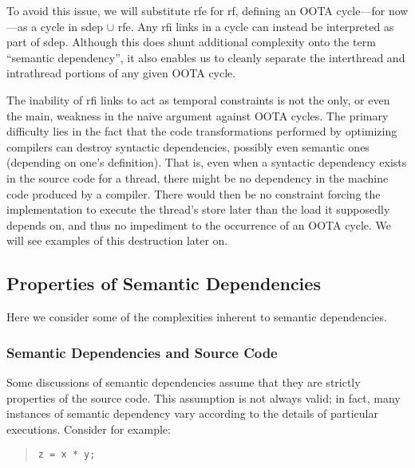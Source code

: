 To avoid this issue, we will substitute rfe
for rf, defining an OOTA cycle---for now---as a cycle in sdep $\cup$ rfe.
Any rfi links in a cycle can instead be interpreted as part of sdep.
Although this does shunt additional complexity onto the term
``semantic dependency'', it also enables us to cleanly separate
the interthread and intrathread portions of any given OOTA cycle.


The inability of rfi links to act as temporal constraints is not the
only, or even the main, weakness in the naive argument against
OOTA cycles.
The primary difficulty lies in the fact that the code transformations
performed by optimizing compilers can destroy syntactic dependencies,
possibly even semantic ones (depending on one's definition).
That is, even when a syntactic dependency exists in the
source code for a thread, there might be no dependency in the machine
code produced by a compiler.
There would then be no constraint forcing the implementation to execute
the thread's store later than the load it supposedly depends on,
and thus no impediment to the occurrence of an OOTA cycle.
We will see examples of this destruction later on.

\subsection{Properties of Semantic Dependencies}
\label{sec:Properties of Semantic Dependencies}

Here we consider some of the complexities inherent to semantic
dependencies.

\subsubsection{Semantic Dependencies and Source Code}
\label{sec:Semantic Dependencies and Source Code}

Some discussions of semantic dependencies assume that they
are strictly properties of the source code.
This assumption is not always valid; in fact, many
instances of semantic dependency vary according to the details of
particular executions.
Consider for example:
\begin{quote}
\begin{verbatim}
z = x * y;
\end{verbatim}
\end{quote}

